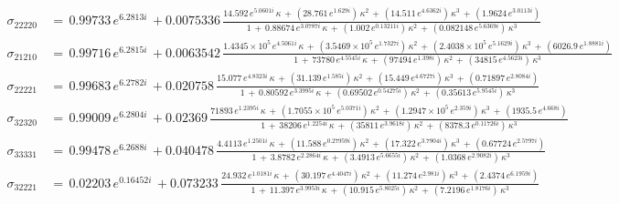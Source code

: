 \begin{align}
  \label{eq:ys22220}
  \sigma_{22220} \, &= \, 0.99733\,e^{6.2813i} \, + 0.0075336 \, \frac{   14.592\,e^{5.0601i}\,\kappa \, + \, (28.761\,e^{1.629i})\,{\kappa}^{2} \, + \, (14.511\,e^{4.6362i})\,{\kappa}^{3} \, + \, (1.9624\,e^{3.0113i})  }{ 1 \, + \,   0.88674\,e^{3.0787i}\,\kappa \, + \, (1.002\,e^{0.13211i})\,{\kappa}^{2} \, + \, (0.082148\,e^{5.6369i})\,{\kappa}^{3} }   \\
  \label{eq:ys21210}
  \sigma_{21210} \, &= \, 0.99716\,e^{6.2815i} \, + 0.0063542 \, \frac{   1.4345\times 10^5\,e^{4.5061i}\,\kappa \, + \, (3.5469\times 10^5\,e^{1.7327i})\,{\kappa}^{2} \, + \, (2.4038\times 10^5\,e^{5.1629i})\,{\kappa}^{3} \, + \, (6026.9\,e^{1.8881i})  }{ 1 \, + \,   73780\,e^{4.5545i}\,\kappa \, + \, (97494\,e^{1.398i})\,{\kappa}^{2} \, + \, (34815\,e^{4.5623i})\,{\kappa}^{3} }   \\
  \label{eq:ys22221}
  \sigma_{22221} \, &= \, 0.99683\,e^{6.2782i} \, + 0.020758 \, \frac{   15.077\,e^{4.8323i}\,\kappa \, + \, (31.139\,e^{1.585i})\,{\kappa}^{2} \, + \, (15.449\,e^{4.6727i})\,{\kappa}^{3} \, + \, (0.71897\,e^{2.8084i})  }{ 1 \, + \,   0.80592\,e^{3.3995i}\,\kappa \, + \, (0.69502\,e^{0.54275i})\,{\kappa}^{2} \, + \, (0.35613\,e^{5.9545i})\,{\kappa}^{3} }   \\
  \label{eq:ys32320}
  \sigma_{32320} \, &= \, 0.99009\,e^{6.2804i} \, + 0.02369 \, \frac{   71893\,e^{1.2395i}\,\kappa \, + \, (1.7055\times 10^5\,e^{5.0371i})\,{\kappa}^{2} \, + \, (1.2947\times 10^5\,e^{2.359i})\,{\kappa}^{3} \, + \, (1935.5\,e^{4.668i})  }{ 1 \, + \,   38206\,e^{1.2254i}\,\kappa \, + \, (35811\,e^{3.9618i})\,{\kappa}^{2} \, + \, (8378.3\,e^{0.11726i})\,{\kappa}^{3} }   \\
  \label{eq:ys33331}
  \sigma_{33331} \, &= \, 0.99478\,e^{6.2688i} \, + 0.040478 \, \frac{   4.4113\,e^{1.2501i}\,\kappa \, + \, (11.588\,e^{0.27959i})\,{\kappa}^{2} \, + \, (17.322\,e^{3.7904i})\,{\kappa}^{3} \, + \, (0.67724\,e^{2.5797i})  }{ 1 \, + \,   3.8782\,e^{2.2864i}\,\kappa \, + \, (3.4913\,e^{5.6655i})\,{\kappa}^{2} \, + \, (1.0368\,e^{2.9082i})\,{\kappa}^{3} }   \\
  \label{eq:ys32221}
  \sigma_{32221} \, &= \, 0.02203\,e^{0.16452i} \, + 0.073233 \, \frac{   24.932\,e^{1.0181i}\,\kappa \, + \, (30.197\,e^{4.4047i})\,{\kappa}^{2} \, + \, (11.274\,e^{2.981i})\,{\kappa}^{3} \, + \, (2.4374\,e^{6.1959i})  }{ 1 \, + \,   11.397\,e^{3.9953i}\,\kappa \, + \, (10.915\,e^{5.8025i})\,{\kappa}^{2} \, + \, (7.2196\,e^{1.8176i})\,{\kappa}^{3} }   \\

\end{align}
